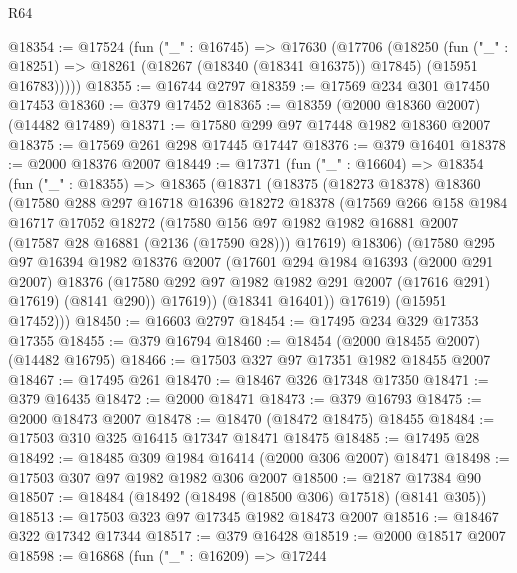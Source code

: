 \begin{lexlean}{R64}
\begin{coremodule}
@18354 := @17524
    (fun ("_" : @16745) =>
    @17630
      (@17706
        (@18250
          (fun ("_" : @18251) => @18261 (@18267 (@18340 (@18341 @16375)) @17845) (@15951 @16783)))))
@18355 := @16744 @2797
@18359 := @17569 @234 @301 @17450 @17453
@18360 := @379 @17452
@18365 := @18359 (@2000 @18360 @2007) (@14482 @17489)
@18371 := @17580 @299 @97 @17448 @1982 @18360 @2007
@18375 := @17569 @261 @298 @17445 @17447
@18376 := @379 @16401
@18378 := @2000 @18376 @2007
@18449 := @17371
    (fun ("_" : @16604) =>
    @18354
      (fun ("_" : @18355) =>
      @18365
        (@18371
          (@18375
            (@18273 @18378)
            @18360
            (@17580
              @288
              @297
              @16718
              @16396
              @18272
              @18378
              (@17569
                @266
                @158
                @1984
                @16717
                @17052
                @18272
                (@17580
                  @156
                  @97
                  @1982
                  @1982
                  @16881
                  @2007
                  (@17587 @28 @16881 (@2136 (@17590 @28)))
                  @17619)
                @18306)
              (@17580
                @295
                @97
                @16394
                @1982
                @18376
                @2007
                (@17601
                  @294
                  @1984
                  @16393
                  (@2000 @291 @2007)
                  @18376
                  (@17580 @292 @97 @1982 @1982 @291 @2007 (@17616 @291) @17619)
                  (@8141 @290))
                @17619))
            (@18341 @16401))
          @17619)
        (@15951 @17452)))
@18450 := @16603 @2797
@18454 := @17495 @234 @329 @17353 @17355
@18455 := @379 @16794
@18460 := @18454 (@2000 @18455 @2007) (@14482 @16795)
@18466 := @17503 @327 @97 @17351 @1982 @18455 @2007
@18467 := @17495 @261
@18470 := @18467 @326 @17348 @17350
@18471 := @379 @16435
@18472 := @2000 @18471
@18473 := @379 @16793
@18475 := @2000 @18473 @2007
@18478 := @18470 (@18472 @18475) @18455
@18484 := @17503 @310 @325 @16415 @17347 @18471 @18475
@18485 := @17495 @28
@18492 := @18485 @309 @1984 @16414 (@2000 @306 @2007) @18471
@18498 := @17503 @307 @97 @1982 @1982 @306 @2007
@18500 := @2187 @17384 @90
@18507 := @18484 (@18492 (@18498 (@18500 @306) @17518) (@8141 @305))
@18513 := @17503 @323 @97 @17345 @1982 @18473 @2007
@18516 := @18467 @322 @17342 @17344
@18517 := @379 @16428
@18519 := @2000 @18517 @2007
@18598 := @16868
    (fun ("_" : @16209) =>
    @17244

\end{coremodule}
\end{lexlean}
